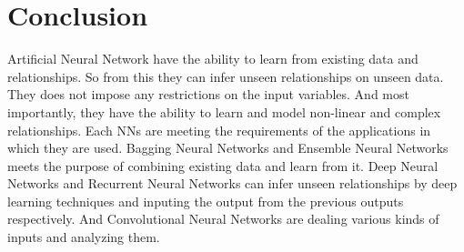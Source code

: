 \documentclass[10pt,a4paper,journal]{IEEEtran}
\begin{document}
\section{Conclusion}
\hspace{2em} Artificial Neural Network have the ability to learn from existing data and relationships. So from this they can infer unseen relationships on unseen data. They does not impose any restrictions on the input variables. And most importantly, they have the ability to learn and model non-linear and complex relationships. Each NNs are meeting the requirements of the applications in which they are used. Bagging Neural Networks and Ensemble Neural Networks meets the purpose of combining existing data and learn from it. Deep Neural Networks and Recurrent Neural Networks can infer unseen relationships by deep learning techniques and inputing the output from the previous outputs respectively. And Convolutional Neural Networks are dealing various kinds of inputs and analyzing them. 
\end{document}
